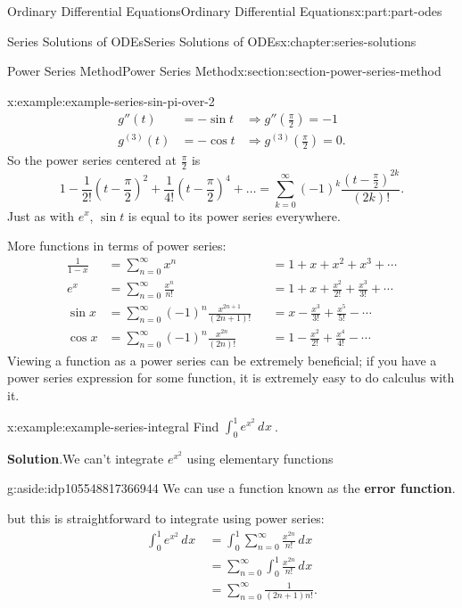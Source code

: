 \documentclass[twoside,10pt,]{book}
\newcommand{\blocktitlefont}{\relax}
\newcommand{\terminology}[1]{\textbf{#1}}
\numberwithin{equation}{part}
\providecommand{\dd}[2][]{\, d^{#1} #2\ }
\newcommand{\amp}{&}
\begin{document}
\begin{partptx}{Ordinary Differential Equations}{}{Ordinary Differential Equations}{}{}{x:part:part-odes}
\begin{chapterptx}{Series Solutions of ODEs}{}{Series Solutions of ODEs}{}{}{x:chapter:series-solutions}
\begin{sectionptx}{Power Series Method}{}{Power Series Method}{}{}{x:section:section-power-series-method}
\begin{example}{}{x:example:example-series-sin-pi-over-2}
\begin{align*}
g''(t) \amp= -\sin t \amp\Rightarrow g''(\frac{\pi}{2}) = -1\\
g^{(3)}(t) \amp= -\cos t \amp\Rightarrow g^{(3)}(\frac{\pi}{2}) = 0\text{.}
\end{align*}
So the power series centered at \(\frac{\pi}{2}\) is%
\begin{equation*}
1 - \frac{1}{2!}(t-\frac{\pi}{2})^{2} + \frac{1}{4!}(t-\frac{\pi}{2})^{4}+\dots = \sum_{k=0}^{\infty}(-1)^{k}\frac{(t-\frac{\pi}{2})^{2k}}{(2k)!}.
\end{equation*}
Just as with \(e^{x}\), \(\sin t\) is equal to its power series everywhere.%
\end{example}
More functions in terms of power series:%
\begin{align*}
\frac{1}{1-x} \amp= \sum_{n=0}^{\infty}x^{n} \amp \amp= 1 + x + x^{2} + x^{3} + \cdots\\
e^{x} \amp= \sum_{n=0}^{\infty}\frac{x^{n}}{n!} \amp \amp= 1 + x + \frac{x^{2}}{2!} + \frac{x^{3}}{3!} + \cdots\\
\sin x \amp= \sum_{n=0}^{\infty}(-1)^{n}\frac{x^{2n+1}}{(2n+1)!} \amp \amp= x - \frac{x^{3}}{3!} + \frac{x^{5}}{5!} - \cdots\\
\cos x \amp= \sum_{n=0}^{\infty}(-1)^{n}\frac{x^{2n}}{(2n)!} \amp \amp= 1 - \frac{x^{2}}{2!} + \frac{x^{4}}{4!} - \cdots
\end{align*}
Viewing a function as a power series can be extremely beneficial; if you have a power series expression for some function, it is extremely easy to do calculus with it.%
\begin{example}{}{x:example:example-series-integral}%
Find \(\displaystyle\int_{0}^{1}e^{x^{2}}\dd{x}\).%
\par\smallskip%
\noindent\textbf{\blocktitlefont Solution}.\hypertarget{g:solution:idp105548817366176}{}\quad{}We can't integrate \(e^{x^{2}}\) using elementary functions \begin{aside}{}{g:aside:idp105548817366944}%
We can use a function known as the \terminology{error function}.%
\end{aside}
 but this is straightforward to integrate using power series:%
\begin{align*}
\int_{0}^{1}e^{x^{2}}\dd{x} \amp= \int_{0}^{1}\sum_{n=0}^{\infty}\frac{x^{2n}}{n!}\dd{x}\\
\amp= \sum_{n=0}^{\infty}\int_{0}^{1}\frac{x^{2n}}{n!}\dd{x}\\
\amp= \sum_{n=0}^{\infty}\frac{1}{(2n+1)n!}\text{.}
\end{align*}
%
\end{example}

\end{sectionptx}
\end{chapterptx}
\end{partptx}
\end{document}
